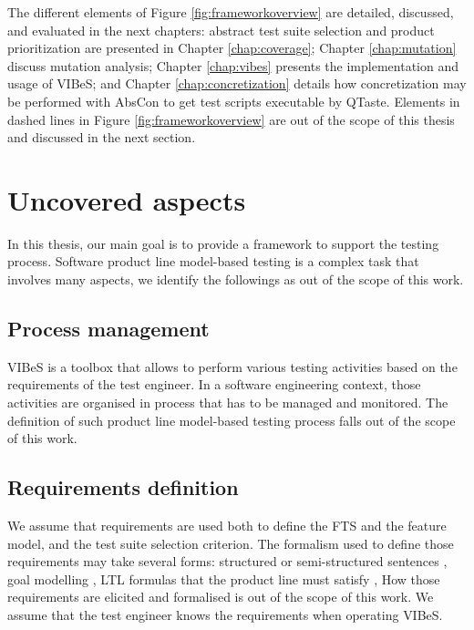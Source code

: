 The different elements of Figure \ref{fig:frameworkoverview} are detailed, discussed, and evaluated in the next chapters: abstract test suite selection and product prioritization are presented in Chapter \ref{chap:coverage}; Chapter \ref{chap:mutation} discuss mutation analysis; Chapter \ref{chap:vibes} presents the implementation and usage of \gls{VIBeS}; and Chapter \ref{chap:concretization} details how concretization may be performed with \gls{AbsCon} to get test scripts executable by \gls{QTaste}. Elements in dashed lines in Figure \ref{fig:frameworkoverview} are out of the scope of this thesis and discussed in the next section.


\section{Uncovered aspects}

In this thesis, our main goal is to provide a framework to support the testing process. Software product line model-based testing is a complex task that involves many aspects, we identify the followings as out of the scope of this work.

\subsection{Process management}

\gls{VIBeS} is a toolbox that allows to perform various testing activities based on the requirements of the test engineer. In a software engineering context, those activities are organised in process \cite{swebok2014} that has to be managed and monitored. The definition of such product line model-based testing process falls out of the scope of this work.

\subsection{Requirements definition}

We assume that requirements are used both to define the FTS and the feature model, and the test suite selection criterion. The formalism used to define those requirements may take several forms: structured or semi-structured sentences \cite{cucumber}, goal modelling \cite{VanLamsweerde2008}, LTL formulas that the product line must satisfy \cite{Classen2013b}, \etc How those requirements are elicited  and formalised \cite{Bagheri2012,Niu2008,Metzger2014} is out of the scope of this work. We assume that the test engineer knows the requirements  when operating \gls{VIBeS}.

